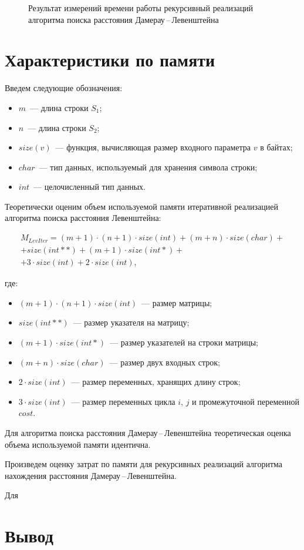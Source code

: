 \begin{figure}[H]
    \centering
    
    \caption{Результат измерений времени работы рекурсивный реализаций алгоритма поиска расстояния Дамерау\,--\,Левенштейна}
    \label{fig:rec-time}
\end{figure}

\section{Характеристики по памяти}

Введем следующие обозначения:

\begin{itemize}
    \item $m$~--- длина строки $S_1$;
    \item $n$~--- длина строки $S_2$;
    \item $size(v)$~--- функция, вычисляющая размер входного параметра $v$ в байтах;
    \item $char$~--- тип данных, используемый для хранения символа строки;
    \item $int$~--- целочисленный тип данных.
\end{itemize}

Теоретически оценим объем используемой памяти итеративной реа\-лизацией алгоритма поиска расстояния Левенштейна:

\begin{multline}
    M_{LevIter} = (m + 1) \cdot (n + 1) \cdot size(int) + (m + n) \cdot size(char) + \\
    + size(int**) + (m + 1) \cdot size(int*) + \\
    + 3 \cdot size(int) + 2 \cdot size(int),
\end{multline}

\noindent где:
\begin{itemize}
    \item $(m + 1) \cdot (n + 1) \cdot size(int)$~--- размер матрицы;
    \item $size(int**)$~--- размер указателя на матрицу;
    \item $(m + 1) \cdot size(int*)$~--- размер указателей на строки матрицы;
    \item $(m + n) \cdot size(char)$~--- размер двух входных строк;
    \item $2 \cdot size(int)$~--- размер переменных, хранящих длину строк;
    \item $3 \cdot size(int)$~--- размер переменных цикла $i$, $j$ и промежуточной переменной $cost$.
\end{itemize}

Для алгоритма поиска расстояния Дамерау\,--\,Левенштейна теорети\-ческая оценка объема используемой памяти идентична.

Произведем оценку затрат по памяти для рекурсивных реализаций алгоритма нахождения расстояния Дамерау\,--\,Левенштейна.

Для 

\section{Вывод}
